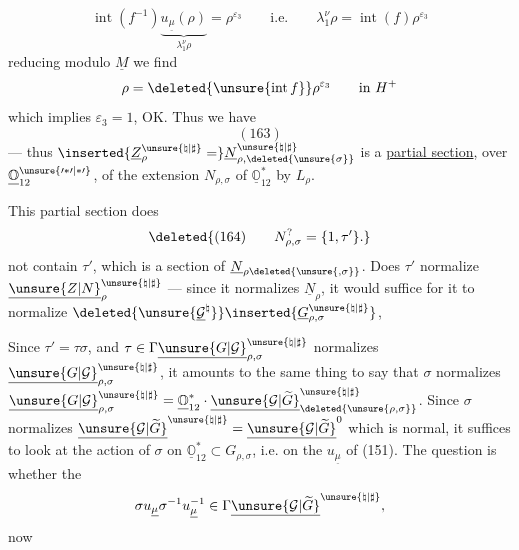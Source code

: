 \[
\operatorname{int}(f^{-1})\underbrace{u_{\underline\mu}(\rho)}_{\lambda_1^\nu\rho}
=\rho^{\varepsilon_3}\qquad\text{i.e.}\qquad
\lambda_1^\nu\rho=\operatorname{int}(f)\rho^{\varepsilon_3}
\]
reducing modulo $\underline M$ we find
\[
\rho=\deleted{\unsure{\operatorname{int}f}}\rho^{\varepsilon_3}\qquad\text{in }H^+
\]
which implies $\varepsilon_3=1$, OK. Thus we have
\[
(163)
\]
--- thus $\inserted{\underline Z_\rho^{\unsure{\natural|\sharp}}=}\underline N_{\rho,\deleted{\unsure{\sigma}}}^{\unsure{\natural|\sharp}}$ is a \uline{partial section}, over $\underline{\mathbb O}_{12}^{\unsure{\prime*\prime|*\prime}}$, of the extension $N_{\rho,\sigma}$ of $\underline{\mathbb O}_{12}^{*}$ by $L_\rho$.

 This partial section does
\[
\deleted{(164)\qquad N_{\rho,\sigma}^{?}=\{1,\tau'\}.}
\]
not contain $\tau'$, which is a section of $\underline N_{\rho\deleted{\unsure{,\sigma}}}$. Does $\tau'$ normalize $\underline{\unsure{Z|N}}_\rho^{\unsure{\natural|\sharp}}$ --- since it normalizes $\underline N_\rho$, it would suffice for it to normalize
$\deleted{\unsure{\underline{\mathcal G}^{\natural}}}\inserted{\underline G_{\rho,\sigma}^{\unsure{\natural|\sharp}}}$,

Since $\tau'=\tau\sigma$,  and
$\tau\in\Gamma\underline{\unsure{G|\mathcal G}}_{\rho,\sigma}^{\unsure{\natural|\sharp}}$
normalizes $\underline{\unsure{G|\mathcal G}}_{\rho,\sigma}^{\unsure{\natural|\sharp}}$,
it amounts to the same thing to say that $\sigma$ normalizes
$\underline{\unsure{G|\mathcal G}}_{\rho,\sigma}^{\unsure{\natural|\sharp}}
=\underline{\mathbb O}_{12}^{*}\cdot\underline{\unsure{\mathcal G|\widetilde G}}^{\unsure{\natural|\sharp}}_{\deleted{\unsure{\rho,\sigma}}}$.
Since $\sigma$ normalizes $\underline{\unsure{\mathcal G|\widetilde G}}^{\unsure{\natural|\sharp}}=\underline{\unsure{\mathcal G|\widetilde G}}^0$ which is normal, it suffices to look at the action of $\sigma$ on $\underline{\mathbb O}_{12}^{*}\subset G_{\rho,\sigma}$,  i.e. on the $u_{\underline\mu}$ of (151). The question is whether the
\[
\sigma u_{\underline\mu}\sigma^{-1}u_{\underline\mu}^{-1}\in\Gamma\underline{\unsure{\mathcal G|\widetilde G}}^{\unsure{\natural|\sharp}},
\]
now
